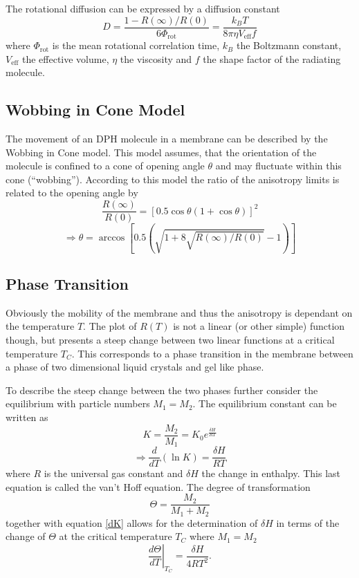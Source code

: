 \documentclass{scrartcl}
\numberwithin{equation}{section}
\numberwithin{figure}{section}
\numberwithin{table}{section}
\newcommand{\eq}[2]{\begin{equation}#1\label{#2}\end{equation}}
\begin{document}
The rotational diffusion can be expressed by a diffusion constant \cite{heyn}
\eq{ D = \frac{1-R(\infty)/R(0)}{6\Phi_\text{rot}} = \frac{k_B T}{8\pi \eta V_\text{eff} f} }{eq:diff}
where $\Phi_\text{rot}$ is the mean rotational correlation time, $k_B$ the Boltzmann constant, $V_\text{eff}$ the effective volume, $\eta$ the viscosity and $f$ the shape factor of the radiating molecule.

\subsection{Wobbing in Cone Model}
The movement of an DPH molecule in a membrane can be described by the Wobbing in Cone model. This model assumes, that the orientation of the molecule is confined to a cone of opening angle $\theta$ and may fluctuate within this cone (``wobbing''). According to this model the ratio of the anisotropy limits is related to the opening angle by
\eq{ \frac{R(\infty)}{R(0)} = \left[ 0.5 \cos \theta (1+\cos \theta) \right]^2 }{}
\eq{ \Rightarrow \theta = \arccos \left[ 0.5\left( \sqrt{1+8\sqrt{R(\infty)/R(0)}}-1 \right) \right] }{eq:theta}

\subsection{Phase Transition}
Obviously the mobility of the membrane and thus the anisotropy is dependant on the temperature $T$. The plot of $R(T)$ is not a linear (or other simple) function though, but presents a steep change between two linear functions at a critical temperature $T_C$. This corresponds to a phase transition in the membrane between a phase of two dimensional liquid crystals and gel like phase.

To describe the steep change between the two phases further consider the equilibrium with particle numbers $M_1=M_2$. The equilibrium constant can be written as
\eq{K = \frac{M_2}{M_1} = K_0 e^{\frac{\delta H}{R T}}}{K}
\eq{\Rightarrow \frac{d}{dT}(\ln K) = \frac{\delta H}{R T}}{dK}
where $R$ is the universal gas constant and $\delta H$ the change in enthalpy. This last equation is called the van't Hoff equation. The degree of transformation 
\eq{\Theta = \frac{M_2}{M_1+M_2}}{Theta}
together with equation \ref{dK} allows for the determination of $\delta H$ in terms of the change of $\Theta$ at the critical temperature $T_C$ where $M_1=M_2$
\eq{{\left.\frac{d\Theta}{dT}\right |}_{T_C} = \frac{\delta H}{4 R T^2} .}{dTheta}

\clearpage
\end{document}
